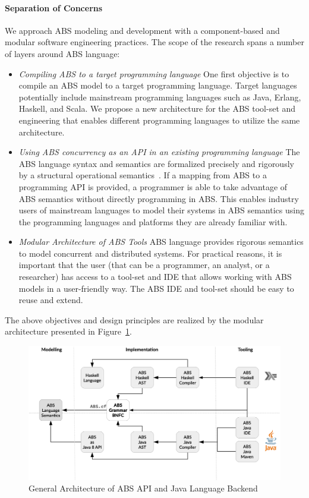 \paragraph{Separation of Concerns} 
We approach ABS modeling and development with a component-based and modular 
software engineering practices.
The scope of the research spans a number of layers around ABS language:

\begin{itemize}
\item \emph{Compiling ABS to a target programming language}
One first objective is to compile an ABS model to a target programming language.
Target languages potentially include mainstream programming languages such as
Java, Erlang, Haskell, and Scala.
We propose a new architecture for the ABS tool-set and engineering that enables
different programming languages to utilize the same architecture.
\item \emph{Using ABS concurrency as an API in an existing programming language}
The ABS language syntax and semantics are formalized precisely and rigorously by a structural operational semantics~\cite{johnsen2012abs}.
If a mapping from ABS to a programming API is provided, a programmer is able to
take advantage of ABS semantics without directly programming in ABS.
This enables industry users of mainstream languages to
model their systems in ABS semantics using the programming languages and
platforms they are already familiar with.
\item \emph{Modular Architecture of ABS Tools}
ABS language provides rigorous semantics to model concurrent
and distributed systems.
For practical reasons, it is important that the user (that can be a programmer, an analyst, or a researcher) 
has access to a tool-set and IDE that allows working with ABS 
models in a user-friendly way.
The ABS IDE and tool-set should be easy to reuse and extend.
\end{itemize}

The above objectives and design principles are realized by the modular architecture presented in 
Figure~\ref{fig:arch}.

\begin{figure}[t]
\centering
\includegraphics[scale=0.3]{../figs/Arch.eps}
\caption[General Architecture]{General Architecture of ABS API and Java Language Backend}
\label{fig:arch}
\end{figure}

